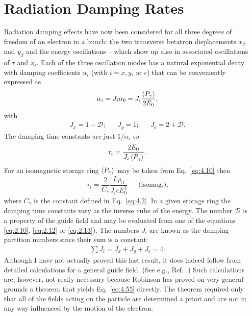 \section{Radiation Damping Rates}\label{sec:4.4}

Radiation damping effects have now been considered for all three degrees of freedom of an electron in a bunch: the two transverse betatron displacements $x_\beta$ and $y_\beta$ and the energy oscillations -- which show up also in associated oscillations of $\tau$ and $x_\epsilon$. Each of the three oscillation modes has a natural exponential decay with damping coefficients $\alpha_i$ (with $i = x, y$, or $\epsilon$) that can be conveniently expressed as
\begin{align}
	\alpha_i = J_i \alpha_0 = J_i \dfrac{\left< P_\gamma \right>}{2 E_0},
\end{align}
with
\begin{align}
	J_x = 1 - \mathscr{D};&& J_y = 1;&& J_\epsilon = 2 + \mathscr{D}.
\end{align}
The damping time constants are just $1/\alpha_i$ so
\begin{align} \label{eq:4.53}
	\tau_i = \dfrac{2 E_0}{J_i \left< P_\gamma \right>}.
\end{align}
For an isomagnetic storage ring $\left< P_\gamma \right>$ may be taken from Eq.~\eqref{eq:4.10} then
\begin{align} \label{eq:4.54}
	\tau_i = \dfrac{2}{C_\gamma} \dfrac{L \rho_0}{J_i c E_0^3} && \text{(isomag.)},
\end{align}
where $C_\gamma$ is the constant defined in Eq.~\ref{eq:4.2}. In a given storage ring the damping
time constants vary as the inverse cube of the energy. The number $\mathscr{D}$ is a property
 of the guide field and may be evaluated from one of the equations \eqref{eq:2.10}, \eqref{eq:2.12}
 or \eqref{eq:2.13}). The numbers $J_i$ are known as the damping partition numbers since their sum is a constant:
\begin{align} \label{eq:4.55}
	\sum J_i = J_x + J_y + J_\epsilon = 4.
\end{align}
Although I have not actually proved this last result, it does indeed follow from detailed calculations for a general guide field. (See e.g., Ref. \cite{5}.) Such calculations are, however, not really necessary because Robinson has proved on very general grounds a theorem that yields Eq.~\eqref{eq:4.55} directly. The theorem required only that all of the fields acting on the particle are determined a priori and are not in any way influenced by the motion of the electron.
